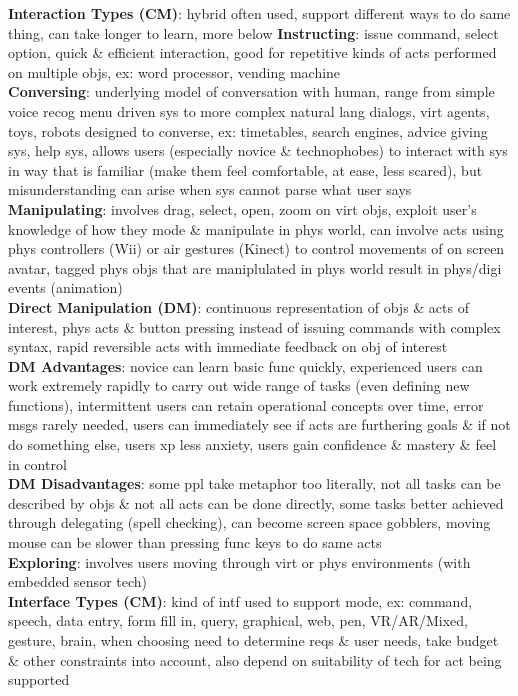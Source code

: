 \documentclass[a4paper]{article}
\begin{document}
\begin{multicols}{3}
        \textbf{Interaction Types (CM)}: hybrid often used, support different ways to do same thing, can take longer to learn, more below
        \textbf{Instructing}: issue command, select option, quick \& efficient interaction, good for repetitive kinds of acts performed on multiple objs, ex: word processor, vending machine\\
        \textbf{Conversing}: underlying model of conversation with human, range from simple voice recog menu driven sys to more complex natural lang dialogs, virt agents, toys, robots designed to converse, ex: timetables, search engines, advice giving sys, help sys, allows users (especially novice \& technophobes) to interact with sys in way that is familiar (make them feel comfortable, at ease, less scared), but misunderstanding can arise when sys cannot parse what user says\\
        \textbf{Manipulating}: involves drag, select, open, zoom on virt objs, exploit user's knowledge of how they mode \& manipulate in phys world, can involve acts using phys controllers (Wii) or air gestures (Kinect) to control movements of on screen avatar, tagged phys objs that are maniplulated in phys world result in phys/digi events (animation)\\
        \textbf{Direct Manipulation (DM)}: continuous representation of objs \& acts of interest, phys acts \& button pressing instead of issuing commands with complex syntax, rapid reversible acts with immediate feedback on obj of interest\\
        \textbf{DM Advantages}: novice can learn basic func quickly, experienced users can work extremely rapidly to carry out wide range of tasks (even defining new functions), intermittent users can retain operational concepts over time, error msgs rarely needed, users can immediately see if acts are furthering goals \& if not do something else, users xp less anxiety, users gain confidence \& mastery \& feel in control\\
        \textbf{DM Disadvantages}: some ppl take metaphor too literally, not all tasks can be described by objs \& not all acts can be done directly, some tasks better achieved through delegating (spell checking), can become screen space gobblers, moving mouse can be slower than pressing func keys to do same acts\\
        \textbf{Exploring}: involves users moving through virt or phys environments (with embedded sensor tech)\\
        \textbf{Interface Types (CM)}: kind of intf used to support mode, ex: command, speech, data entry, form fill in, query, graphical, web, pen, VR/AR/Mixed, gesture, brain, when choosing need to determine reqs \& user needs, take budget \& other constraints into account, also depend on suitability of tech for act being supported\\

\end{multicols}
\end{document}
